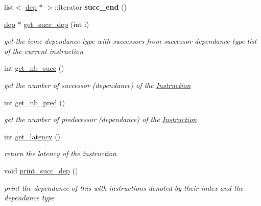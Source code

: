 \begin{DoxyCompactItemize}
\item 
\hypertarget{class_instruction_a0800ca0afbbc783b57170d981d406fb6}{}list$<$ \hyperlink{structdep}{dep} $\ast$ $>$\+::iterator {\bfseries succ\+\_\+end} ()\label{class_instruction_a0800ca0afbbc783b57170d981d406fb6}

\item 
\hypertarget{class_instruction_ad3bb47ea5f9e4b975e0191d6c96ffc30}{}\hyperlink{structdep}{dep} $\ast$ \hyperlink{class_instruction_ad3bb47ea5f9e4b975e0191d6c96ffc30}{get\+\_\+succ\+\_\+dep} (int i)\label{class_instruction_ad3bb47ea5f9e4b975e0191d6c96ffc30}

\begin{DoxyCompactList}\small\item\em get the ieme dependance type with successors from successor dependance type list of the current instruction \end{DoxyCompactList}\item 
\hypertarget{class_instruction_ab2d8c29efa78ec3c1a70f154a8c2f068}{}int \hyperlink{class_instruction_ab2d8c29efa78ec3c1a70f154a8c2f068}{get\+\_\+nb\+\_\+succ} ()\label{class_instruction_ab2d8c29efa78ec3c1a70f154a8c2f068}

\begin{DoxyCompactList}\small\item\em get the number of successor (dependance) of the \hyperlink{class_instruction}{Instruction} \end{DoxyCompactList}\item 
\hypertarget{class_instruction_a9e56e8e2c857abc409f27af9f80f9595}{}int \hyperlink{class_instruction_a9e56e8e2c857abc409f27af9f80f9595}{get\+\_\+nb\+\_\+pred} ()\label{class_instruction_a9e56e8e2c857abc409f27af9f80f9595}

\begin{DoxyCompactList}\small\item\em get the number of predecessor (dependance) of the \hyperlink{class_instruction}{Instruction} \end{DoxyCompactList}\item 
\hypertarget{class_instruction_ac2988d2fb858b720e009da03120ae4c7}{}int \hyperlink{class_instruction_ac2988d2fb858b720e009da03120ae4c7}{get\+\_\+latency} ()\label{class_instruction_ac2988d2fb858b720e009da03120ae4c7}

\begin{DoxyCompactList}\small\item\em return the latency of the instruction \end{DoxyCompactList}\item 
\hypertarget{class_instruction_af489e680ae3c69fd12b0a23e959172e5}{}void \hyperlink{class_instruction_af489e680ae3c69fd12b0a23e959172e5}{print\+\_\+succ\+\_\+dep} ()\label{class_instruction_af489e680ae3c69fd12b0a23e959172e5}

\begin{DoxyCompactList}\small\item\em print the dependance of this with instructions denoted by their index and the dependance type \end{DoxyCompactList}\end{DoxyCompactItemize}
